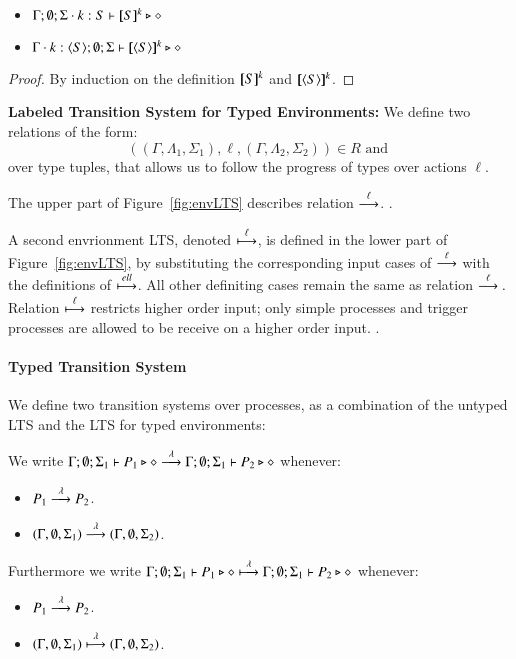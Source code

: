 \begin{proposition}\rm
	\begin{itemize}
		\item	$\Gamma; \emptyset; \Sigma \cdot k:S \vdash [\!\![S]\!\!]^k \triangleright \diamond$
		\item	$\Gamma \cdot k:\langle S \rangle; \emptyset; \Sigma \vdash [\!\![\langle S \rangle]\!\!]^k \triangleright \diamond$
	\end{itemize}
\end{proposition}

\begin{proof}
	By induction on the definition $[\!\![S]\!\!]^k$ and $[\!\![\langle S \rangle]\!\!]^k$.
\end{proof}


{\bf Labeled Transition System for Typed Environments: }
We define two relations of the form:
%
\[
	((\Gamma, \Lambda_1, \Sigma_1), \ell, (\Gamma, \Lambda_2, \Sigma_2)) \in R \textrm{ and }
\]
%
\noi over type tuples, that allows us to follow the progress of types over actions $\ell$.



The upper part of Figure~\ref{fig:envLTS} describes relation $\stackrel{\ell}{\longrightarrow}$.
.

A second envrionment LTS, denoted $\stackrel{\ell}{\longmapsto}$, is defined in the lower part of
Figure~\ref{fig:envLTS}, by substituting the corresponding input cases
of $\stackrel{\ell}{\longrightarrow}$ with the definitions of $\stackrel{ell}{\longmapsto}$. All other definiting
cases remain the same as relation $\stackrel{\ell}{\longrightarrow}. $Relation $\stackrel{\ell}{\longmapsto}$ 
restricts higher order input; only simple processes and trigger processes
are allowed to be receive on a higher order input.
. 

\paragraph{Typed Transition System}

We define two transition systems over processes, as a combination
of the untyped LTS and the LTS for typed environments:

\begin{definition}\rm
	We write
	$\Gamma; \emptyset; \Sigma_1 \vdash P_1 \triangleright \diamond \stackrel{\lambda}{\longrightarrow} \Gamma; \emptyset; \Sigma_1 \vdash P_2 \triangleright \diamond$
	whenever:
%
	\begin{itemize}
		\item	$P_1 \stackrel{\lambda}{\longrightarrow} P_2$.
		\item	$(\Gamma, \emptyset, \Sigma_1) \stackrel{\lambda}{\longrightarrow} (\Gamma, \emptyset, \Sigma_2)$.
	\end{itemize}
%

	Furthermore we write
	$\Gamma; \emptyset; \Sigma_1 \vdash P_1 \triangleright \diamond \stackrel{\lambda}{\longmapsto} \Gamma; \emptyset; \Sigma_1 \vdash P_2 \triangleright \diamond$
	whenever:
%
	\begin{itemize}
		\item	$P_1 \stackrel{\lambda}{\longrightarrow} P_2$.
		\item	$(\Gamma, \emptyset, \Sigma_1) \stackrel{\lambda}{\longmapsto} (\Gamma, \emptyset, \Sigma_2)$.
	\end{itemize}
%
\end{definition}

